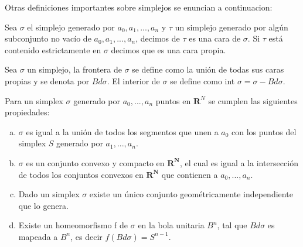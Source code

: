 %
Otras definiciones importantes sobre simplejos se enuncian a continuacion:
\begin{Defi}
Sea $\sigma$ el simplejo generado por $a_0,a_1,...,a_n$ y $\tau$ un simplejo generado por algún subconjunto no vacío de $a_0,a_1,...,a_n$, decimos de $\tau$ es una cara de $\sigma$. Si $\tau$ está contenido estrictamente en $\sigma$ decimos que es una cara propia. 
\end{Defi}
\begin{Defi}
Sea $\sigma$ un simplejo, la frontera de $\sigma$ se define como la unión de todas sus caras propias y se denota por $Bd\sigma$. El interior de $\sigma$ se define como int $\sigma = \sigma-Bd\sigma$. 
\end{Defi}
\begin{Prop}
Para un simplex $\sigma$ generado por $a_0,...,a_n$ puntos en $\mathbf{R}^{N}$ se cumplen las siguientes propiedades:
\begin{enumerate}[(a)]
\item $\sigma$ es igual a la unión de todos los segmentos que unen a $a_0$ con los puntos del simplex $S$ generado por $a_1,...,a_n$.
\item $\sigma$ es un conjunto convexo y compacto en $\mathbf{R^{N}}$, el cual es igual a la intersección de todos los conjuntos convexos en $\mathbf{R^{N}}$ que contienen a $a_0,...,a_n$.
\item Dado un simplex $\sigma$ existe un único conjunto geométricamente independiente que lo genera.
\item Existe un homeomorfismo f de $\sigma$ en la bola unitaria $B^n$, tal que $Bd\sigma$ es mapeada a $B^n$, es decir $f(Bd\sigma) = S^{n-1}$.
\end{enumerate}
\end{Prop}

